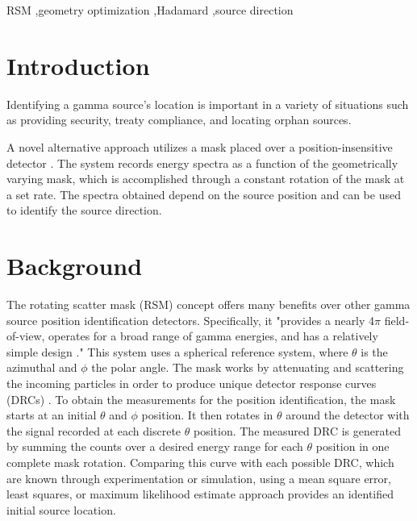 \documentclass[3p,times]{elsarticle}
\begin{document}
\begin{frontmatter}
\begin{keyword}
RSM \sep geometry optimization \sep Hadamard \sep source direction

\end{keyword}

\end{frontmatter}


\section{Introduction}
\label{intro}
Identifying a gamma source's location is important in a variety of situations such as providing security, treaty compliance, and locating orphan sources.  

A novel alternative approach utilizes a mask placed over a position-insensitive detector \cite{FitzGerald2015}.  
The system records energy spectra as a function of the geometrically varying mask, which is accomplished through a constant rotation of the mask at a set rate. 
The spectra obtained depend on the source position and can be used to identify the source direction.  

\section{Background}
The rotating scatter mask (RSM) concept offers many benefits over other gamma source position identification detectors.  
Specifically, it "provides a nearly 4$\pi$ field-of-view, operates for a broad range of gamma energies, and has a relatively simple design \cite{Logan2017}." 
This system uses a spherical reference system, where $\theta$ is the azimuthal and $\phi$ the polar angle.  
The mask works by attenuating and scattering the incoming particles in order to produce unique detector response curves (DRCs) \cite{Logan2017}.  
To obtain the measurements for the position identification, the mask starts at an initial $\theta$ and $\phi$ position.
It then rotates in $\theta$ around the detector with the signal recorded at each discrete $\theta$ position.  
The measured DRC is generated by summing the counts over a desired energy range for each $\theta$ position in one complete mask rotation.  
Comparing this curve with each possible DRC, which are known through experimentation or simulation, using a mean square error, least squares, or maximum likelihood estimate approach provides an identified initial source location.
\end{document}
